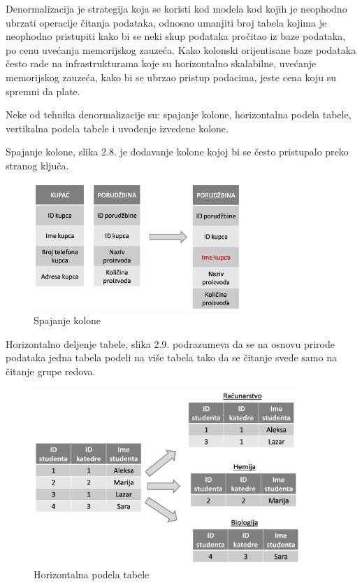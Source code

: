 \documentclass[12pt,oneside]{memoir}
\begin{document}
Denormalizacija je strategija koja se koristi kod modela kod kojih je neophodno ubrzati operacije čitanja podataka, odnosno umanjiti broj tabela kojima je neophodno pristupiti kako bi se neki skup podataka pročitao iz baze podataka, po cenu uvećanja memorijskog zauzeća. Kako kolonski orijentisane baze podataka često rade na infrastrukturama koje su horizontalno skalabilne, uvećanje memorijskog zauzeća, kako bi se ubrzao pristup podacima, jeste cena koju su spremni da plate.
 
Neke od tehnika denormalizacije su:  spajanje kolone, horizontalna podela tabele, vertikalna podela tabele i uvođenje izvedene kolone. 

Spajanje kolone, slika 2.8. je dodavanje kolone kojoj bi se često pristupalo preko stranog ključa.

\begin{figure}[!ht]
  \centering
  \includegraphics[width=0.7\textwidth]{denormalizacija.png}
  \caption{Spajanje kolone}
  \label{fig:grafikon}
\end{figure}

Horizontalno deljenje tabele, slika 2.9. podrazumeva da se na osnovu prirode podataka jedna tabela podeli na više tabela tako da se čitanje svede samo na čitanje grupe redova. 

\begin{figure}[!ht]
  \centering
  \includegraphics[width=0.9\textwidth]{denormalizacija2.png}
  \caption{Horizontalna podela tabele}
  \label{fig:grafikon}
\end{figure}
\end{document}
